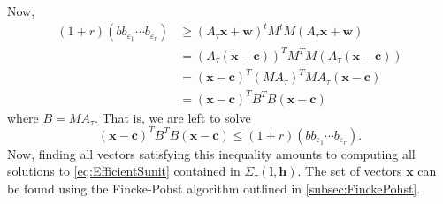 \documentclass[11pt]{report}
\theoremstyle{definition}
\begin{document}
Now,
\begin{align*}
(1 + r)(bb_{\varepsilon_1}\cdots b_{\varepsilon_r})
	& \geq (A_\tau \mathbf{x}+\mathbf{w})^tM^tM(A_\tau \mathbf{x}+\mathbf{w}) \\
	& = (A_\tau (\mathbf{x}-\mathbf{c}))^TM^TM(A_\tau (\mathbf{x}-\mathbf{c}))\\
	& = (\mathbf{x}-\mathbf{c})^T(MA_{\tau})^TMA_\tau(\mathbf{x}-\mathbf{c})\\
	& = (\mathbf{x}-\mathbf{c})^TB^TB(\mathbf{x}-\mathbf{c})
\end{align*}
where $B = MA_\tau$. That is, we are left to solve
\[(\mathbf{x}-\mathbf{c})^TB^TB(\mathbf{x}-\mathbf{c}) \leq (1 + r)(bb_{\varepsilon_1}\cdots b_{\varepsilon_r}).\]
Now, finding all vectors satisfying this inequality amounts to computing all solutions to \eqref{eq:EfficientSunit} contained in $\Sigma_{\tau}(\mathbf{l}, \mathbf{h})$. The set of vectors $\mathbf{x}$ can be found using the Fincke-Pohst algorithm outlined in \autoref{subsec:FinckePohst}.


\end{document}
